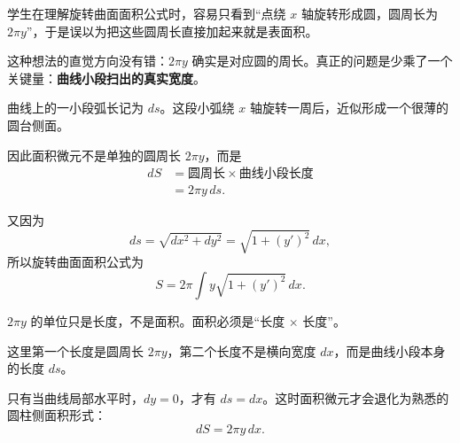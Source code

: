 \begin{trapbox}

	\begin{description}[style=nextline, leftmargin=2.8em, labelsep=0.5em, itemsep=0.45em]

		\item[\textbf{\textcolor{CTrap}{易错点一（把圆周长直接相加）：}}]
		      学生在理解旋转曲面面积公式时，容易只看到“点绕 $x$ 轴旋转形成圆，圆周长为 $2\pi y$”，于是误以为把这些圆周长直接加起来就是表面积。

		      这种想法的直觉方向没有错：$2\pi y$ 确实是对应圆的周长。真正的问题是少乘了一个关键量：\textbf{曲线小段扫出的真实宽度}。

		      \begin{center}
			      \resizebox{0.98\linewidth}{!}					      {}
		      \end{center}
		\item[\textbf{\textcolor{CTrap}{正确理解：}}]
		      曲线上的一小段弧长记为 $ds$。这段小弧绕 $x$ 轴旋转一周后，近似形成一个很薄的圆台侧面。

		      因此面积微元不是单独的圆周长 $2\pi y$，而是
		      \[
			      \begin{aligned}
				      dS
				       & =\text{圆周长}\times\text{曲线小段长度} \\
				       & =2\pi y\,ds.
			      \end{aligned}
		      \]

		      又因为
		      \[
			      ds=\sqrt{dx^{2}+dy^{2}}
			      =\sqrt{1+(y')^{2}}\,dx,
		      \]
		      所以旋转曲面面积公式为
		      \[
			      S=2\pi\int y\sqrt{1+(y')^{2}}\,dx.
		      \]

		\item[\textbf{\textcolor{CTrap}{错因分析：}}]
		      $2\pi y$ 的单位只是长度，不是面积。面积必须是“长度 $\times$ 长度”。

		      这里第一个长度是圆周长 $2\pi y$，第二个长度不是横向宽度 $dx$，而是曲线小段本身的长度 $ds$。

		      只有当曲线局部水平时，$dy=0$，才有 $ds=dx$。这时面积微元才会退化为熟悉的圆柱侧面积形式：
		      \[
			      dS=2\pi y\,dx.
		      \]


\end{description}
\end{trapbox}
